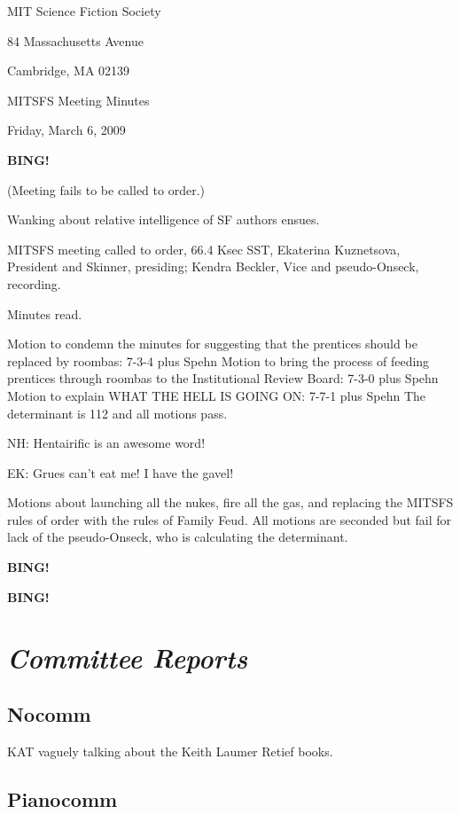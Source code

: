 \documentclass[10pt]{article}
\newcommand{\bing}{{\bf BING!} }
\newcommand{\goto}[1]{\bing \vskip 12pt \section*{{\em{#1}}}}
\newcommand{\ps}{ plus Spehn\xspace}
\begin{document}
\begin{center}

MIT Science Fiction Society

84 Massachusetts Avenue

Cambridge, MA 02139

\vspace{12pt}

MITSFS Meeting Minutes

Friday, March 6, 2009

\end{center}

\vspace{18pt}

\setlength{\parskip}{6pt}

\noindent

\bing

(Meeting fails to be called to order.)

Wanking about relative intelligence of SF authors ensues.

MITSFS meeting called to order, 66.4 Ksec SST,
Ekaterina Kuznetsova, President and Skinner, presiding; Kendra Beckler, Vice and pseudo-Onseck, recording.

Minutes read.

Motion to condemn the minutes for suggesting that the prentices should be replaced by roombas: 7-3-4 \ps
Motion to bring the process of feeding prentices through roombas to the Institutional Review Board: 7-3-0 \ps
Motion to explain WHAT THE HELL IS GOING ON: 7-7-1 \ps
The determinant is 112 and all motions pass.

NH: Hentairific is an awesome word!

EK: Grues can't eat me!  I have the gavel!

Motions about launching all the nukes, fire all the gas, and replacing
the MITSFS rules of order with the rules of Family Feud.  All motions
are seconded but fail for lack of the pseudo-Onseck, who is
calculating the determinant.

\bing

\goto{Committee Reports}

\subsection*{Nocomm}

KAT vaguely talking about the Keith Laumer Retief books.

\subsection*{Pianocomm}
\end{document}
